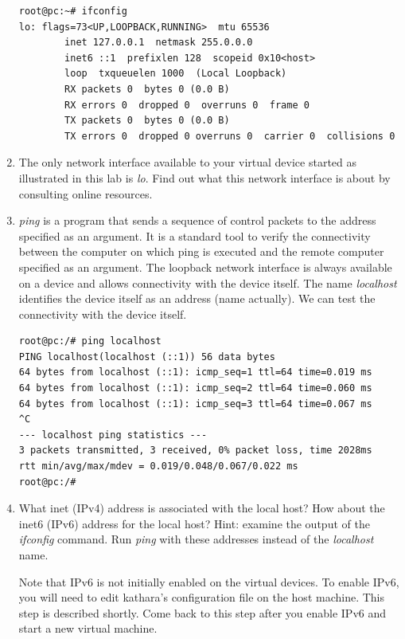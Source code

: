 \documentclass[12pt]{book}
\begin{document}
\begin{enumerate}[label=Activity \arabic*:]
\begin{lstlisting}
root@pc:~# ifconfig
lo: flags=73<UP,LOOPBACK,RUNNING>  mtu 65536
        inet 127.0.0.1  netmask 255.0.0.0
        inet6 ::1  prefixlen 128  scopeid 0x10<host>
        loop  txqueuelen 1000  (Local Loopback)
        RX packets 0  bytes 0 (0.0 B)
        RX errors 0  dropped 0  overruns 0  frame 0
        TX packets 0  bytes 0 (0.0 B)
        TX errors 0  dropped 0 overruns 0  carrier 0  collisions 0
\end{lstlisting}

\item The only network interface available to your virtual device started as illustrated in this lab is \emph{lo}. Find out what this network interface is about by consulting online resources.

\item \emph{ping} is a program that sends a sequence of control packets to the address specified as an argument. It is a standard tool to verify the connectivity between the computer on which ping is executed and the remote computer specified as an argument. The loopback network interface is always available on a device and allows connectivity with the device itself. The name \emph{localhost} identifies the device itself as an address (name actually). We can test the connectivity with the device itself.

\begin{lstlisting}
root@pc:/# ping localhost
PING localhost(localhost (::1)) 56 data bytes
64 bytes from localhost (::1): icmp_seq=1 ttl=64 time=0.019 ms
64 bytes from localhost (::1): icmp_seq=2 ttl=64 time=0.060 ms
64 bytes from localhost (::1): icmp_seq=3 ttl=64 time=0.067 ms
^C
--- localhost ping statistics ---
3 packets transmitted, 3 received, 0% packet loss, time 2028ms
rtt min/avg/max/mdev = 0.019/0.048/0.067/0.022 ms
root@pc:/# 
\end{lstlisting}

\item What inet (IPv4) address is associated with the local host? How about the inet6 (IPv6) address for the local host? Hint: examine the output of the \emph{ifconfig} command. Run \emph{ping} with these addresses instead of the \emph{localhost} name.

  Note that IPv6 is not initially enabled on the virtual devices. To enable IPv6, you will need to edit kathara's configuration file on the host machine. This step is described shortly. Come back to this step after you enable IPv6 and start a new virtual machine.


\end{enumerate}
\end{document}
